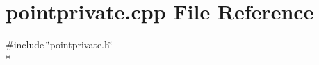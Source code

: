 \section{pointprivate.\+cpp File Reference}
\label{bk3_2curve_2pointprivate_8cpp}
{\ttfamily \#include \char`\"{}pointprivate.\+h\char`\"{}}\\*
